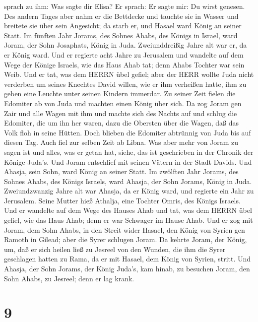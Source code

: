 sprach zu ihm: Was sagte dir Elisa? Er sprach: Er sagte mir: Du wirst
genesen.  Des andern Tages aber nahm er die Bettdecke und
tauchte sie in Wasser und breitete sie über sein Angesicht; da starb er,
und Hasael ward König an seiner Statt.  Im fünften Jahr
Jorams, des Sohnes Ahabs, des Königs in Israel, ward Joram, der Sohn
Josaphats, König in Juda.  Zweiunddreißig Jahre alt war er,
da er König ward. Und er regierte acht Jahre zu Jerusalem 
und wandelte auf dem Wege der Könige Israels, wie das Haus Ahab tat;
denn Ahabs Tochter war sein Weib. Und er tat, was dem HERRN übel gefiel;
 aber der HERR wollte Juda nicht verderben um seines
Knechtes David willen, wie er ihm verheißen hatte, ihm zu geben eine
Leuchte unter seinen Kindern immerdar.  Zu seiner Zeit
fielen die Edomiter ab von Juda und machten einen König über sich.
 Da zog Joram gen Zair und alle Wagen mit ihm und machte
sich des Nachts auf und schlug die Edomiter, die um ihn her waren, dazu
die Obersten über die Wagen, daß das Volk floh in seine Hütten.
 Doch blieben die Edomiter abtrünnig von Juda bis auf
diesen Tag. Auch fiel zur selben Zeit ab Libna.  Was aber
mehr von Joram zu sagen ist und alles, was er getan hat, siehe, das ist
geschrieben in der Chronik der Könige Juda's.  Und Joram
entschlief mit seinen Vätern in der Stadt Davids. Und Ahasja, sein Sohn,
ward König an seiner Statt.  Im zwölften Jahr Jorams, des
Sohnes Ahabs, des Königs Israels, ward Ahasja, der Sohn Jorams, König in
Juda.  Zweiundzwanzig Jahre alt war Ahasja, da er König
ward, und regierte ein Jahr zu Jerusalem. Seine Mutter hieß Athalja,
eine Tochter Omris, des Königs Israels.  Und er wandelte
auf dem Wege des Hauses Ahab und tat, was dem HERRN übel gefiel, wie das
Haus Ahab; denn er war Schwager im Hause Ahab.  Und er zog
mit Joram, dem Sohn Ahabs, in den Streit wider Hasael, den König von
Syrien gen Ramoth in Gilead; aber die Syrer schlugen Joram.
 Da kehrte Joram, der König, um, daß er sich heilen ließ zu
Jesreel von den Wunden, die ihm die Syrer geschlagen hatten zu Rama, da
er mit Hasael, dem König von Syrien, stritt. Und Ahasja, der Sohn
Jorams, der König Juda's, kam hinab, zu besuchen Joram, den Sohn Ahabs,
zu Jesreel; denn er lag krank.

\hypertarget{section-8}{%
\section{9}\label{section-8}}

